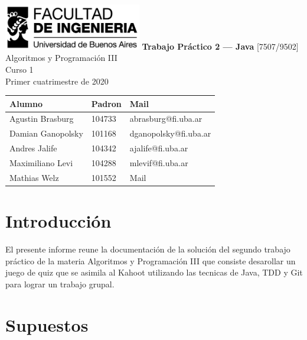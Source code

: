 \documentclass[titlepage,a4paper]{article}
\begin{document}
\begin{titlepage} %
	\hfill\includegraphics[width=6cm]{logofiuba.jpg}
    \centering
    \vfill
    \Huge \textbf{Trabajo Práctico 2 — Java}
    \vskip2cm
    \Large [7507/9502] Algoritmos y Programación III\\
    Curso 1 \\ %
    Primer cuatrimestre de 2020
    \vfill
    \begin{tabular}{ | l | l | l |} %
      \hline
      Alumno & Padron & Mail \\ [0.5ex] 
      \hline\hline
     Agustin Brasburg & 104733 & abrasburg@fi.uba.ar\\ 
     \hline
     Damian Ganopolsky & 101168 & dganopolsky@fi.uba.ar\\
     \hline
     Andres Jalife & 104342 & ajalife@fi.uba.ar \\
     \hline
    Maximiliano Levi & 104288 & mlevif@fi.uba.ar \\
     \hline
     Mathias Welz & 101552 & Mail \\ [1ex] 
     \hline
  	\end{tabular}
    \vfill
    \vfill
\end{titlepage}

\tableofcontents %
\newpage

\section{Introducción}\label{sec:intro}
El presente informe reune la documentación de la solución del segundo trabajo práctico de la materia Algoritmos y Programación III que consiste desarollar un juego de quiz que se asimila al Kahoot utilizando las tecnicas de Java, TDD y Git para lograr un trabajo grupal.

\section{Supuestos}\label{sec:supuestos}
\end{document}
